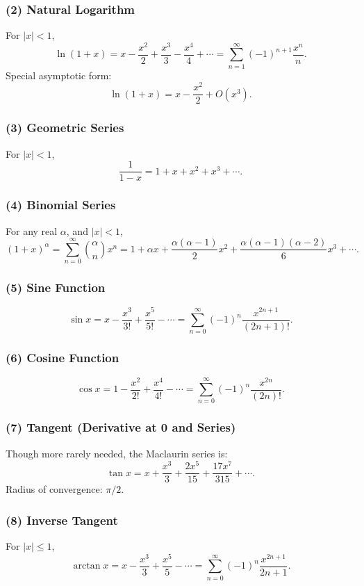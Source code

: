 \documentclass[10pt]{article}
\theoremstyle{definition}
\begin{document}
\subsubsection*{(2) Natural Logarithm}
For \(|x|<1\),
\[
\ln(1+x)
    = x - \frac{x^2}{2} + \frac{x^3}{3} - \frac{x^4}{4} + \cdots
    = \sum_{n=1}^\infty (-1)^{n+1}\frac{x^n}{n}.
\]
Special asymptotic form:
\[
\ln(1+x) = x - \frac{x^2}{2} + O(x^3).
\]

\subsubsection*{(3) Geometric Series}
For \(|x|<1\),
\[
\frac{1}{1-x}
    = 1 + x + x^2 + x^3 + \cdots.
\]

\subsubsection*{(4) Binomial Series}
For any real \(\alpha\), and \(|x|<1\),
\[
(1+x)^\alpha
    = \sum_{n=0}^{\infty}
      \binom{\alpha}{n} x^n
    = 1 + \alpha x + \frac{\alpha(\alpha-1)}{2}x^2
        + \frac{\alpha(\alpha-1)(\alpha-2)}{6}x^3 + \cdots.
\]

\subsubsection*{(5) Sine Function}
\[
\sin x
= x - \frac{x^3}{3!} + \frac{x^5}{5!} - \cdots
= \sum_{n=0}^{\infty} (-1)^n \frac{x^{2n+1}}{(2n+1)!}.
\]

\subsubsection*{(6) Cosine Function}
\[
\cos x
= 1 - \frac{x^2}{2!} + \frac{x^4}{4!} - \cdots
= \sum_{n=0}^{\infty} (-1)^n \frac{x^{2n}}{(2n)!}.
\]

\subsubsection*{(7) Tangent (Derivative at 0 and Series)}
Though more rarely needed, the Maclaurin series is:
\[
\tan x
= x + \frac{x^3}{3} + \frac{2x^5}{15} + \frac{17x^7}{315} + \cdots.
\]
Radius of convergence: \(\pi/2\).

\subsubsection*{(8) Inverse Tangent}
For \(|x|\le 1\),
\[
\arctan x
    = x - \frac{x^3}{3} + \frac{x^5}{5} - \cdots
    = \sum_{n=0}^{\infty} (-1)^n \frac{x^{2n+1}}{2n+1}.
\]
\end{document}
